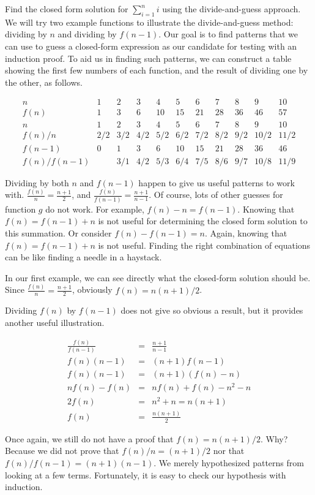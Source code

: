 \begin{example}
Find the closed form solution for \(\sum_{i=1}^n i\) using
the divide-and-guess approach.
We will try two example functions to illustrate the divide-and-guess
method: dividing by \(n\) and dividing by \(f(n-1)\).
Our goal is to find patterns that we can use to guess a closed-form
expression as our candidate for testing with an
induction proof.
To aid us in finding such patterns, we can construct a table showing
the first few numbers of each function, and the result of dividing one
by the other, as follows.

{\small
\[
\begin{array}{r|rrrrrrrrrr}
n&1&2&3&4&5&6&7&8&9&10\\
\hline
f(n)&1&3&6&10&15&21&28&36&46&57\\
n&1&2&3&4&5&6&7&8&9&10\\
f(n)/n&2/2&3/2&4/2&5/2&6/2&7/2&8/2&9/2&10/2&11/2\\
f(n\!-\!1)&0&1&3&6&10&15&21&28&36&46\\
f(n)/f(n\!-\!1)&&3/1&4/2&5/3&6/4&7/5&8/6&9/7&10/8&11/9
\end{array}\]
}

Dividing by both \(n\) and \(f(n-1)\) happen to give us useful
patterns to work with.
\(\frac{f(n)}{n} = \frac{n+1}{2}\), and 
\(\frac{f(n)}{f(n-1)} = \frac{n+1}{n-1}\).
Of course, lots of other guesses for function \(g\) do not work.
For example, \(f(n) - n = f(n-1)\).
Knowing that \(f(n) = f(n-1) + n\) is not useful for determining the
closed form solution to this summation.
Or consider \(f(n) - f(n-1) = n\).
Again, knowing that \(f(n) = f(n-1) + n\) is not useful.
Finding the right combination of equations can be like finding a
needle in a haystack.

In our first example, we can see directly what the closed-form
solution should be.
Since \(\frac{f(n)}{n} = \frac{n+1}{2}\),
obviously \(f(n) = n(n+1)/2\).

Dividing \(f(n)\) by \(f(n-1)\) does not give so obvious a result,
but it provides another useful illustration.

\begin{eqnarray*}
\frac{f(n)}{f(n-1)} &=& \frac{n+1}{n-1}\\
f(n) (n-1) &=& (n+1) f(n-1)\\
f(n) (n-1) &=& (n+1) (f(n) - n)\\
n f(n) - f(n) &=& n f(n) + f(n) - n^2 - n\\
2 f(n) &=& n^2 + n = n (n+1)\\
f(n) &=& \frac{n (n + 1)}{2}
\end{eqnarray*}

Once again, we still do not have a proof that
\(f(n) = n(n+1)/2\). Why?
Because we did not prove that \(f(n)/n = (n+1)/2\) nor that
\(f(n)/f(n-1) = (n+1)(n-1)\).
We merely hypothesized patterns from looking at a few terms.
Fortunately, it is easy to check our hypothesis with
induction.
\end{example}

